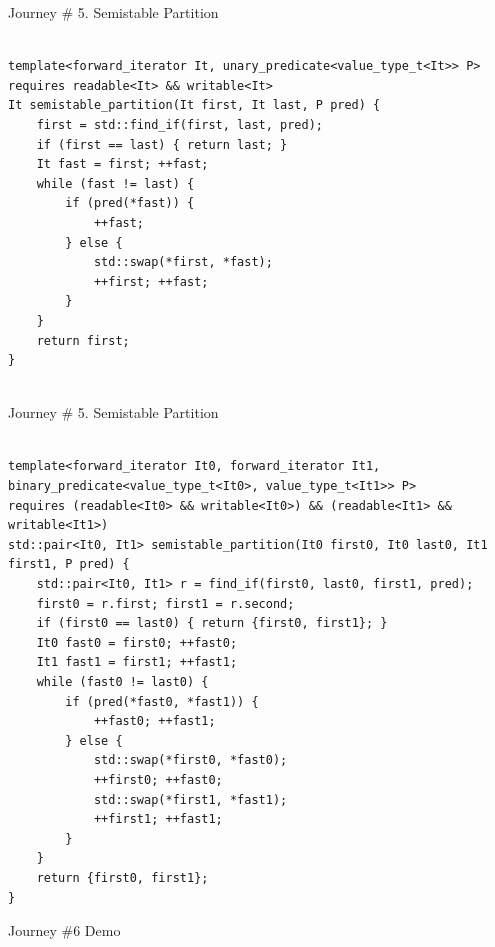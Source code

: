 \documentclass[10pt]{beamer}
\begin{document}
\begin{frame}[fragile]{Journey \# 5. Semistable Partition}
\begin{lstlisting}[style=cpp] %%%%%%%

template<forward_iterator It, unary_predicate<value_type_t<It>> P>
requires readable<It> && writable<It>
It semistable_partition(It first, It last, P pred) {
    first = std::find_if(first, last, pred);
    if (first == last) { return last; }
    It fast = first; ++fast;
    while (fast != last) {
        if (pred(*fast)) {
            ++fast;
        } else {
            std::swap(*first, *fast);
            ++first; ++fast;
        }
    }
    return first;
}


\end{lstlisting}
\end{frame}

\begin{frame}[fragile]{Journey \# 5. Semistable Partition}
\begin{lstlisting}[style=cpp] %%%%%%%

template<forward_iterator It0, forward_iterator It1, binary_predicate<value_type_t<It0>, value_type_t<It1>> P>
requires (readable<It0> && writable<It0>) && (readable<It1> && writable<It1>)
std::pair<It0, It1> semistable_partition(It0 first0, It0 last0, It1 first1, P pred) {
    std::pair<It0, It1> r = find_if(first0, last0, first1, pred);
    first0 = r.first; first1 = r.second;
    if (first0 == last0) { return {first0, first1}; }
    It0 fast0 = first0; ++fast0;
    It1 fast1 = first1; ++fast1;
    while (fast0 != last0) {
        if (pred(*fast0, *fast1)) {
            ++fast0; ++fast1;
        } else {
            std::swap(*first0, *fast0);
            ++first0; ++fast0;
            std::swap(*first1, *fast1);
            ++first1; ++fast1;
        }
    }
    return {first0, first1};
}

\end{lstlisting}
\end{frame}

\begin{frame}[fragile]{Journey \#6}
\Huge Demo
\end{frame}
\end{document}
